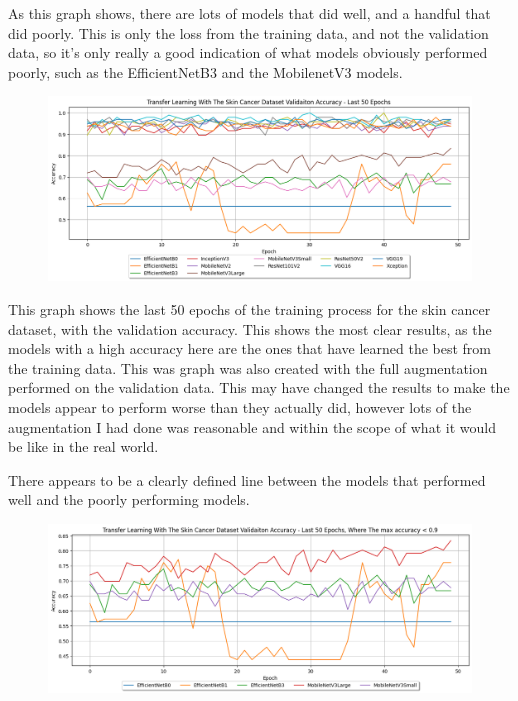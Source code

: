 \documentclass[]{final_report}
\begin{document}
As this graph shows, there are lots of models that did well, and a handful that did poorly. This is only the loss from the training data, and not the validation data, so it's only really a good indication of what models obviously performed poorly, such as the EfficientNetB3 and the MobilenetV3 models.

\pagebreak

\begin{figure}[ht!]
  \centering
  \includegraphics[width=1\textwidth]{images/skin-cancer-validation-accuracy-last-50.png}
\end{figure}

This graph shows the last 50 epochs of the training process for the skin cancer dataset, with the validation accuracy. This shows the most clear results, as the models with a high accuracy here are the ones that have learned the best from the training data.
This was graph was also created with the full augmentation performed on the validation data. This may have changed the results to make the models appear to perform worse than they actually did, however lots of the augmentation I had done was reasonable and within the scope of what it would be like in the real world.

There appears to be a clearly defined line between the models that performed well and the poorly performing models.

\begin{figure}[ht!]
  \centering
  \includegraphics[width=1\textwidth]{images/Skin-cancer-validation-accuracy-last-50-low-performers.png}
\end{figure}
\end{document}
